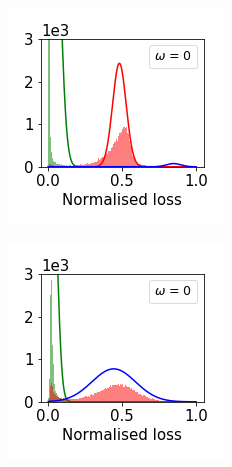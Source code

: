 \documentclass[12pt]{article}
\begin{document}
\begin{figure}[t]
\begin{subfigure}{.18\textwidth}
      \includegraphics[width=\linewidth]{images/loss_dist/EDM_0.6_1.00_imagenet32.png} 
    \end{subfigure}
    \begin{subfigure}{.18\textwidth}
      \centering
      \includegraphics[width=\linewidth]{images/loss_dist/DM_0.6_1.00_cifar100.png} 

\end{subfigure}
\end{figure}
\end{document}

